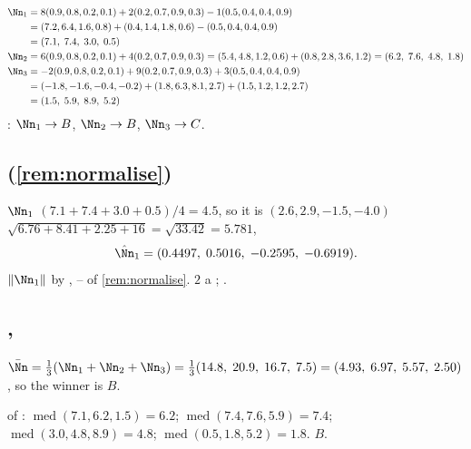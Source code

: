 \begin{align*}
\Nn_1 &= 8(0.9,0.8,0.2,0.1)+2(0.2,0.7,0.9,0.3)-1(0.5,0.4,0.4,0.9)\\
      &= (7.2,6.4,1.6,0.8)+(0.4,1.4,1.8,0.6)-(0.5,0.4,0.4,0.9)\\
      &= (7.1,\;7.4,\;3.0,\;0.5)\\
\Nn_2 &= 6(0.9,0.8,0.2,0.1)+4(0.2,0.7,0.9,0.3)
       = (5.4,4.8,1.2,0.6)+(0.8,2.8,3.6,1.2) = (6.2,\;7.6,\;4.8,\;1.8)\\
\Nn_3 &= -2(0.9,0.8,0.2,0.1)+9(0.2,0.7,0.9,0.3)+3(0.5,0.4,0.4,0.9)\\
      &= (-1.8,-1.6,-0.4,-0.2)+(1.8,6.3,8.1,2.7)+(1.5,1.2,1.2,2.7)\\
      &= (1.5,\;5.9,\;8.9,\;5.2)
\end{align*}
  : $\Nn_1 \to B$, $\Nn_2 \to B$, $\Nn_3 \to C$.

\subsection{   (\cref{rem:normalise})}

$\Nn_1$   $(7.1+7.4+3.0+0.5)/4 = 4.5$, so  it is
$(2.6,2.9,-1.5,-4.0)$  
$\sqrt{6.76+8.41+2.25+16}=\sqrt{33.42}=5.781$, 
\[
\hat \Nn_1 = (0.4497,\;0.5016,\;-0.2595,\;-0.6919).
\]
 $\|\Nn_1\|$     by   ,  
 --    of \cref{rem:normalise}.  $2$   
    a    ;  
   .

\subsection{,  }

 $\bar\Nn = \tfrac13(\Nn_1+\Nn_2+\Nn_3)
= \tfrac13(14.8,\;20.9,\;16.7,\;7.5) = (4.93,\;6.97,\;5.57,\;2.50)$, so the winner
is $B$.

   of   :
$\operatorname{med}(7.1,6.2,1.5)=6.2$;
$\operatorname{med}(7.4,7.6,5.9)=7.4$;
$\operatorname{med}(3.0,4.8,8.9)=4.8$;
$\operatorname{med}(0.5,1.8,5.2)=1.8$.  $B$.

